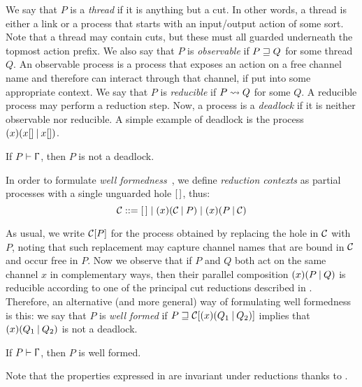 We say that $P$ is a \emph{thread} if it is anything but a cut. In other words,
a thread is either a link or a process that starts with an input/output action
of some sort. Note that a thread may contain cuts, but these must all guarded
underneath the topmost action prefix.
%
We also say that $P$ is \emph{observable} if $P \sqsupseteq Q$ for some thread $Q$.
An observable process is a process that exposes an action on a free channel name
and therefore can interact through that channel, if put into some appropriate
context. We say that $P$ is \emph{reducible} if $P \leadsto Q$ for some $Q$. A
reducible process may perform a reduction step.
%
Now, a process is a \emph{deadlock} if it is neither observable nor reducible. A
simple example of deadlock is the process $(x)(x[]\mathbin|x[])$. 

\begin{theorem}
    \label{thm:df}
    If $\wtp{P}\Context$, then $P$ is not a deadlock.
\end{theorem}

In order to formulate \emph{well formedness}~\cite{CarboneEtAl}, we define
\emph{reduction contexts} as partial processes with a single unguarded hole
$[\,]$, thus:
\[
    \mathcal{C} ::= [\,] \mid (x)(\mathcal{C}\mathbin| P) \mid (x)(P\mathbin|\mathcal{C})
\]

As usual, we write $\mathcal{C}[P]$ for the process obtained by replacing
the hole in $\mathcal{C}$ with $P$, noting that such replacement may
capture channel names that are bound in $\mathcal{C}$ and occur free in
$P$.
%
Now we observe that if $P$ and $Q$ both act on the same channel $x$ in
complementary ways, then their parallel composition $(x)(P\mathbin| Q)$ is reducible
according to one of the principal cut reductions described in
. Therefore, an alternative (and more general) way of
formulating well formedness is this:
%
we say that $P$ is \emph{well formed} if $P \sqsupseteq
\mathcal{C}[(x)(Q_1\mathbin| Q_2)]$ implies that $(x)(Q_1\mathbin| Q_2)$ is not a
deadlock.

\begin{theorem}
    \label{thm:type-safety}
    If $\wtp{P}\Context$, then $P$ is well formed.
\end{theorem}

Note that the properties expressed in  are
invariant under reductions thanks to .
